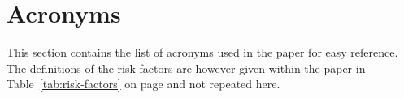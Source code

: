 \documentclass[12pt]{article}
\theoremstyle{definition}
\renewcommand{\_}{%
    \textunderscore\hspace{0pt}%
}
\begin{document}

%
%

\section{Acronyms}

This section contains the list of acronyms used in the paper for easy reference. The definitions of the risk factors are however given within the paper in Table~\ref{tab:risk-factors} on page \pageref{tab:risk-factors} and not repeated here.
\end{document}
